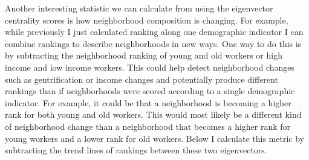 \documentclass{article}
\theoremstyle{definition}
\theoremstyle{remark}
\begin{document}
Another interesting statistic we can calculate from using the eigenvector centrality scores is how neighborhood composition is changing.  For example, while previously I just calculated ranking along one demographic indicator I can combine rankings to describe neighborhoods in new ways.  One way to do this is by subtracting the neighborhood ranking of young and old workers or high income and low income workers.  This could help detect neighborhood changes such as gentrification or income changes and potentially produce different rankings than if neighborhoods were scored according to a single demographic indicator.  For example, it could be that a neighborhood is becoming a higher rank for both young and old workers.  This would most likely be a different kind of neighborhood change than a neighborhood that becomes a higher rank for young workers and a lower rank for old workers.  Below I calculate this metric by subtracting the trend lines of rankings between these two eigenvectors. \\
\end{document}

